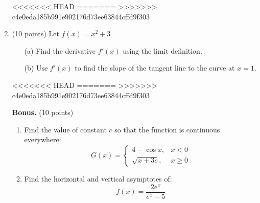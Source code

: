 \begin{enumerate}
<<<<<<< HEAD
=======
>>>>>>> c4e0eda185b991e902176d73ee63844cffd9f303
    \item (10 points) Let \( f(x) = x^2 + 3 \)
    \begin{enumerate}
        \item [(a)] Find the derivative \( f'(x) \) using the limit definition.
        \item [(b)] Use \( f'(x) \) to find the slope of the tangent line to the curve at \( x = 1 \).
    \end{enumerate}

<<<<<<< HEAD
=======
>>>>>>> c4e0eda185b991e902176d73ee63844cffd9f303
    \item[\textbf{Bonus.}] (10 points)
    \begin{enumerate}
        \item Find the value of constant \( c \) so that the function is continuous everywhere:
        \[
        G(x) = 
        \begin{cases}
            4 - \cos x, & x < 0 \\
            \sqrt{x + 3c}, & x \geq 0
        \end{cases}
        \]

        \item Find the horizontal and vertical asymptotes of:
        \[
        f(x) = \frac{2e^x}{e^x - 5}
        \]
    \end{enumerate}
\end{enumerate}
